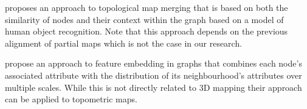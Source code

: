 \citet{rincon_map_2019} proposes an approach to topological map merging that is based on both the similarity of nodes and their context within the graph based on a model of human object recognition. Note that this approach depends on the previous alignment of partial maps which is not the case in our research.

\citet{rozemberczki_multi-scale_2021} propose an approach to feature embedding in graphs that combines each node's associated attribute with the distribution of its neighbourhood's attributes over multiple scales. While this is not directly related to 3D mapping their approach can be applied to topometric maps.